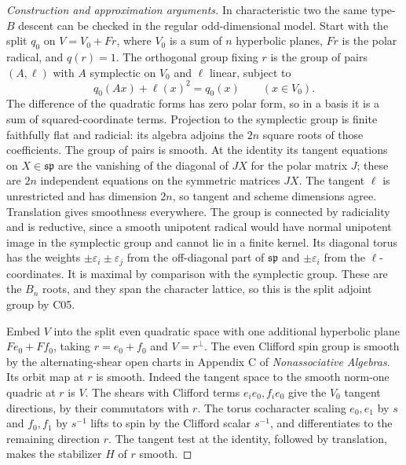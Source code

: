 \documentclass[11pt,a4paper,openany,oneside]{book}
\theoremstyle{resultstyle}
\theoremstyle{definition}
\numberwithin{equation}{chapter}
\begin{document}
\begin{proof}[Construction and approximation arguments]
In characteristic two the same type-\(B\) descent can be
checked in the regular odd-dimensional model. Start with the
split \(q_0\) on \(V=V_0+Fr\), where \(V_0\) is a sum of
\(n\) hyperbolic planes, \(Fr\) is the polar radical,
and \(q(r)=1\). The orthogonal group fixing \(r\) is
the group of pairs \((A,\ell)\) with \(A\) symplectic on
\(V_0\) and \(\ell\) linear, subject to
\[
 q_0(Ax)+\ell(x)^2=q_0(x) \qquad(x\in V_0).
\]
The difference of the quadratic forms has zero polar form,
so in a basis it is a sum of squared-coordinate terms.
Projection to the symplectic group is finite faithfully
flat and radicial: its algebra adjoins the \(2n\) square
roots of those coefficients. The group of pairs is smooth.
At the identity its tangent equations on \(X\in\mathfrak{sp}\)
are the vanishing of the diagonal of \(JX\) for the
polar matrix \(J\); these are \(2n\) independent equations
on the symmetric matrices \(JX\). The tangent \(\ell\)
is unrestricted and has dimension \(2n\), so tangent
and scheme dimensions agree. Translation gives smoothness
everywhere. The group is connected by radiciality and
is reductive, since a smooth unipotent radical would have
normal unipotent image in the symplectic group and cannot
lie in a finite kernel. Its diagonal torus has the
weights \(\pm\varepsilon_i\pm\varepsilon_j\) from the
off-diagonal part of \(\mathfrak{sp}\) and
\(\pm\varepsilon_i\) from the \(\ell\)-coordinates.
It is maximal by comparison with the symplectic group.
These are the \(B_n\) roots, and they span the character
lattice, so this is the split adjoint group by C05.

Embed \(V\) into the split even quadratic space with one
additional hyperbolic plane \(Fe_0+Ff_0\), taking
\(r=e_0+f_0\) and \(V=r^\perp\). The even Clifford spin
group is smooth by the alternating-shear open charts
in Appendix C of \emph{Nonassociative Algebras}.
Its orbit map at \(r\) is smooth. Indeed the tangent
space to the smooth norm-one quadric at \(r\) is \(V\).
The shears with Clifford terms \(e_i e_0,f_i e_0\)
give the \(V_0\) tangent directions, by their commutators
with \(r\). The torus cocharacter scaling \(e_0,e_1\)
by \(s\) and \(f_0,f_1\) by \(s^{-1}\) lifts to spin by
the Clifford scalar \(s^{-1}\), and differentiates to
the remaining direction \(r\). The tangent test at the
identity, followed by translation, makes the stabilizer
\(H\) of \(r\) smooth.


\end{proof}
\end{document}
